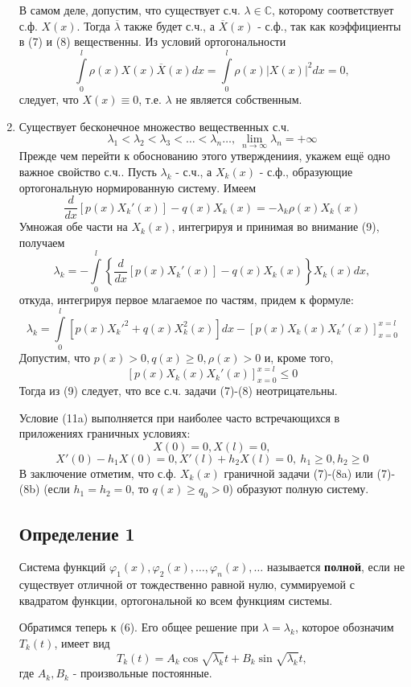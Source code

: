 \begin{enumerate}
{					В самом деле, допустим, что существует с.ч. $\lambda \in \mathbb{C}$, которому соответствует с.ф. $X(x)$. Тогда $\overline{\lambda}$ также будет с.ч., а $\overline{X}(x)$ - с.ф., так как коэффициенты в (7) и (8) вещественны. Из условий ортогональности
					\[
						\int\limits_0^l \rho(x) X(x) \overline{X}(x) dx = \int\limits_0^l \rho(x) \left| X(x)\right|^2 dx=0,
					\]
					следует, что $X(x) \equiv 0$, т.е. $\lambda$ не является собственным.
				}
			\item{Существует бесконечное множество вещественных с.ч.
					\[
						\lambda_1 < \lambda_2 < \lambda_3 < \dots < \lambda_n \dots, ~ \lim_{n \to \infty} \lambda_n = +\infty
					\]	
				Прежде чем перейти к обоснованию этого утверждениия, укажем ещё одно важное свойство с.ч.. Пусть $\lambda_k$ - с.ч., а $X_k(x)$ - с.ф., образующие ортогональную нормированную систему. Имеем
				\[
					\frac{d}{dx} \left[ p(x) X_k'(x)\right] - q(x) X_k (x) = -\lambda_k \rho(x) X_k (x)
				\]
				Умножая обе части на $X_k (x)$, интегрируя и принимая во внимание (9), получаем
				\[
					\lambda_k = -\int\limits_0^l \left\{ \frac{d}{dx} \left[ p(x) X_k'(x)\right]-q(x) X_k(x)\right\} X_k(x) dx,
				\]
				откуда, интегрируя первое млагаемое по частям, придем к формуле:
				\[
					\lambda_k = \int\limits_0^l \left[ p(x) {X_k'}^2+q(x) X_k^2(x)\right]dx - \left[p(x) X_k(x) X_k'(x) \right]_{x=0}^{x=l} \tag{11}
				\]
				Допустим, что $p(x)>0, q(x)\ge 0, \rho(x)>0$ и, кроме того,
				\[
					\left[ p(x) X_k(x) X_k'(x)\right]_{x=0}^{x=l} \le 0 \tag{11a}
				\]
				Тогда из (9) следует, что все с.ч. задачи (7)-(8) неотрицательны.

				Условие (11a) выполняется при наиболее часто встречающихся в приложениях граничных условиях:
				\[
					X(0)=0, X(l)=0 \tag{8a},
				\]
				\[
					X'(0)-h_1X(0)=0, X'(l) + h_2 X(l) = 0, ~ h_1 \ge 0, h_2 \ge 0 \tag{8b}
				\]
				В заключение отметим, что с.ф. $X_k(x)$ граничной задачи (7)-(8a) или (7)-(8b) (если $h_1 = h_2 = 0$, то $q(x) \ge q_0 > 0$) образуют полную систему.
					}
\subsection{Определение 1}
Система функций $\varphi_1(x), \varphi_2(x), \dots, \varphi_n (x), \dots$ называется \textbf{полной}, если не существует отличной от тождественно равной нулю, суммируемой с квадратом функции, ортогональной ко всем функциям системы.

Обратимся теперь к (6). Его общее решение при $\lambda = \lambda_k$, которое обозначим $T_k(t)$, имеет вид
\[
	T_k (t) = A_k \cos \sqrt{\lambda_k} t + B_k \sin \sqrt{\lambda_k} t,
\]
где $A_k, B_k$ - произвольные постоянные.


\end{enumerate}
